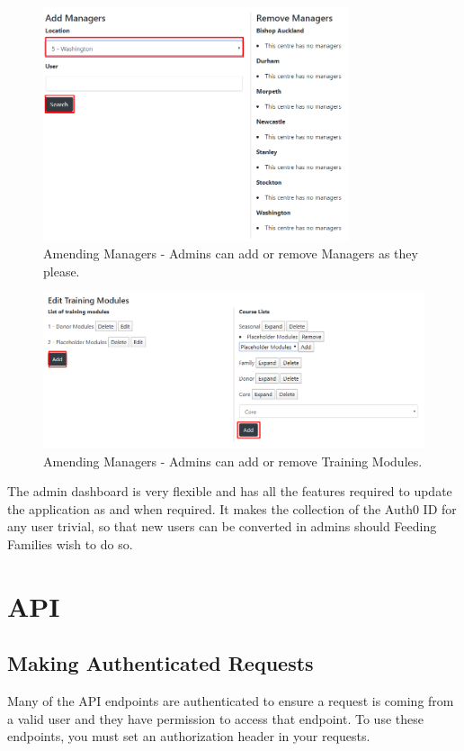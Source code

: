 \documentclass[12pt]{article}
\begin{document}
\begin{figure}[H]
    \centering
    \includegraphics[width=0.8\textwidth]{admins/addmanagers.png}
    \caption{Amending Managers - Admins can add or remove Managers as they please.}
\end{figure}
\newpage

\begin{figure}[H]
    \centering
    \includegraphics[scale=0.7]{admins/Training Modules.png}
    \caption{Amending Managers - Admins can add or remove Training Modules.}
\end{figure}

The admin dashboard is very flexible and has all the features required to update the application as and when required. It makes the collection of the Auth0 ID for any user trivial, so that new users can be converted in admins should Feeding Families wish to do so. 
\newpage
\section{API} %

\subsection{Making Authenticated Requests}
Many of the API endpoints are authenticated to ensure a request is coming from a valid user and they have permission to access that endpoint. To use these endpoints, you must set an authorization header in your requests.
\end{document}
